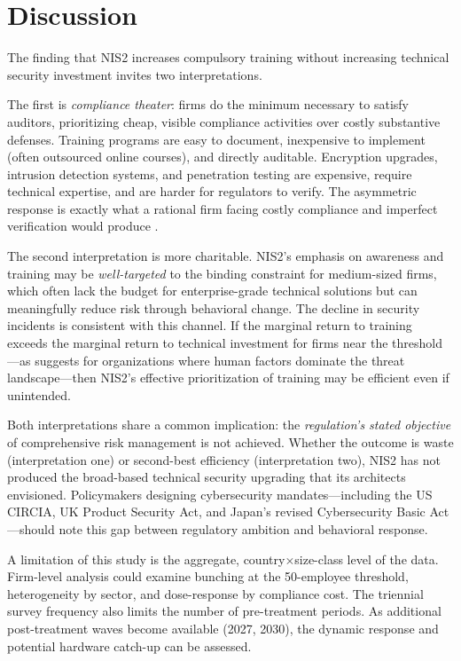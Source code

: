 \documentclass[12pt]{article}
\begin{document}
\section{Discussion}

The finding that NIS2 increases compulsory training without increasing technical security investment invites two interpretations.

The first is \textit{compliance theater}: firms do the minimum necessary to satisfy auditors, prioritizing cheap, visible compliance activities over costly substantive defenses. Training programs are easy to document, inexpensive to implement (often outsourced online courses), and directly auditable. Encryption upgrades, intrusion detection systems, and penetration testing are expensive, require technical expertise, and are harder for regulators to verify. The asymmetric response is exactly what a rational firm facing costly compliance and imperfect verification would produce \citep{stigler1971theory, bandiera2009active}.

The second interpretation is more charitable. NIS2's emphasis on awareness and training may be \textit{well-targeted} to the binding constraint for medium-sized firms, which often lack the budget for enterprise-grade technical solutions but can meaningfully reduce risk through behavioral change. The decline in security incidents is consistent with this channel. If the marginal return to training exceeds the marginal return to technical investment for firms near the threshold---as \citet{anderson2001why} suggests for organizations where human factors dominate the threat landscape---then NIS2's effective prioritization of training may be efficient even if unintended.

Both interpretations share a common implication: the \textit{regulation's stated objective} of comprehensive risk management is not achieved. Whether the outcome is waste (interpretation one) or second-best efficiency (interpretation two), NIS2 has not produced the broad-based technical security upgrading that its architects envisioned. Policymakers designing cybersecurity mandates---including the US CIRCIA, UK Product Security Act, and Japan's revised Cybersecurity Basic Act---should note this gap between regulatory ambition and behavioral response.

A limitation of this study is the aggregate, country$\times$size-class level of the data. Firm-level analysis could examine bunching at the 50-employee threshold, heterogeneity by sector, and dose-response by compliance cost. The triennial survey frequency also limits the number of pre-treatment periods. As additional post-treatment waves become available (2027, 2030), the dynamic response and potential hardware catch-up can be assessed.
\end{document}
